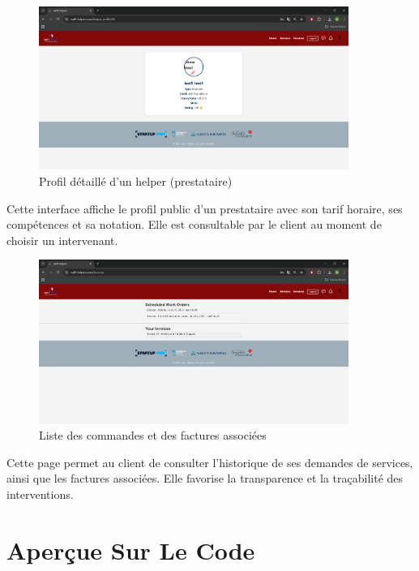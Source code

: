 \vspace{0.5cm}

\begin{figure}[H]
    \centering
    \includegraphics[width=0.9\textwidth]{figures/profil helper.png}
    \caption{Profil détaillé d’un helper (prestataire)}
\end{figure}

\noindent
Cette interface affiche le profil public d’un prestataire avec son tarif horaire, ses compétences et sa notation. Elle est consultable par le client au moment de choisir un intervenant.

\vspace{0.5cm}

\begin{figure}[H]
    \centering
    \includegraphics[width=0.9\textwidth]{figures/facture client.png}
    \caption{Liste des commandes et des factures associées}
\end{figure}

\noindent
Cette page permet au client de consulter l’historique de ses demandes de services, ainsi que les factures associées. Elle favorise la transparence et la traçabilité des interventions.

\section{Aperçue Sur Le Code}

